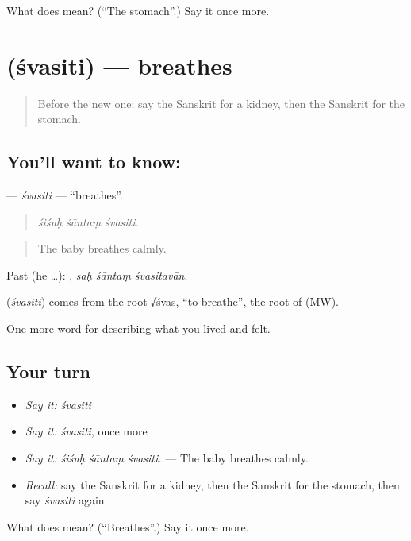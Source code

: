 \begin{tcolorbox}[breakable,colback=teal!4,colframe=teal!35!black,title={Before you move on}]
What does  mean? (\textquotedblleft{}The stomach\textquotedblright{}.) Say it once more.
\end{tcolorbox}
\section[\texorpdfstring{\sk{श्वसिति} (śvasiti)}{श्वसिति (śvasiti)}]{ (śvasiti) — breathes}

\label{lesson:SA-C470-svasiti}



\begin{quote}
Before the new one: say the Sanskrit for a kidney, then the Sanskrit for the stomach.
\end{quote}

\subsection*{You'll want to know: }
\textbf{} — \emph{śvasiti} — \textquotedblleft{}breathes\textquotedblright{}.

\begin{quote}
  
\end{quote}

\begin{quote}
\emph{śiśuḥ śāntaṃ śvasiti.}
\end{quote}

\begin{quote}
The baby breathes calmly.
\end{quote}

Past (he …):   , \emph{saḥ śāntaṃ śvasitavān}.

\begin{cousinweb}
\textbf{} (\emph{śvasiti}) comes from the root √śvas, \textquotedblleft{}to breathe\textquotedblright{}, the root of \textbf{} (MW).
\end{cousinweb}

\begin{grammarlens}[title={What you've built}]
One more word for describing what you lived and felt.
\end{grammarlens}

\subsection*{Your turn}
\begin{itemize}
\raggedright
  \item \emph{Say it:} \emph{śvasiti}
  \item \emph{Say it:} \emph{śvasiti}, once more
  \item \emph{Say it:} \emph{śiśuḥ śāntaṃ śvasiti.} — The baby breathes calmly.
  \item \emph{Recall:} say the Sanskrit for a kidney, then the Sanskrit for the stomach, then say \emph{śvasiti} again
\end{itemize}

\begin{tcolorbox}[breakable,colback=teal!4,colframe=teal!35!black,title={Before you move on}]
What does  mean? (\textquotedblleft{}Breathes\textquotedblright{}.) Say it once more.
\end{tcolorbox}
